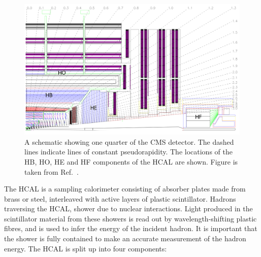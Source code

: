 \begin{figure}[htb!]
  \centering
  \includegraphics[width=.9\textwidth]{Figures/cms/hcal.pdf}
  \caption[The CMS hadronic calorimeter]
  {
    A schematic showing one quarter of the CMS detector. The dashed lines indicate lines of constant pseudorapidity. The locations of the HB, HO, HE and HF components of the HCAL are shown. Figure is taken from Ref.~\cite{}.
  }
  \label{fig:cms_hcal}
\end{figure}

The HCAL is a sampling calorimeter consisting of absorber plates made from brass or steel, interleaved with active layers of plastic scintillator. Hadrons traversing the HCAL, shower due to nuclear interactions. Light produced in the scintillator material from these showers is read out by wavelength-shifting plastic fibres, and is used to infer the energy of the incident hadron. It is important that the shower is fully contained to make an accurate measurement of the hadron energy. The HCAL is split up into four components:

